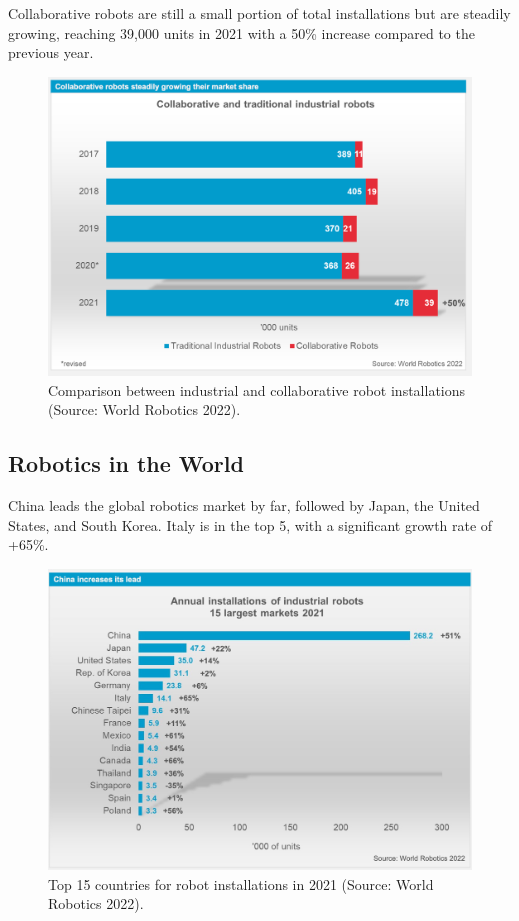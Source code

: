 Collaborative robots are still a small portion of total installations but are steadily growing, reaching 39,000 units in 2021 with a 50\% increase compared to the previous year.

\begin{figure}[H]
  \centering
  \includegraphics[width=0.85\linewidth]{imgs/industrial_vs_collaborative_robots.png}
  \caption{Comparison between industrial and collaborative robot installations (Source: World Robotics 2022).}
\end{figure}

\hfill

\subsection{Robotics in the World}

China leads the global robotics market by far, followed by Japan, the United States, and South Korea. Italy is in the top 5, with a significant growth rate of +65\%.

\begin{figure}[H]
  \centering
  \includegraphics[width=0.85\linewidth]{imgs/robotics_by_country.png}
  \caption{Top 15 countries for robot installations in 2021 (Source: World Robotics 2022).}
\end{figure}

\newpage
